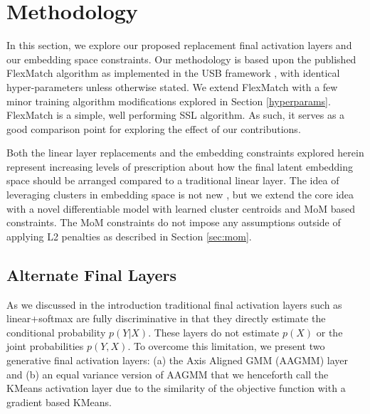 \documentclass[10pt,twocolumn,letterpaper]{article}
\begin{document}




\section{Methodology}

In this section, we explore our proposed replacement final activation layers and our embedding space constraints.
Our methodology is based upon the published FlexMatch \cite{zhang2021flexmatch} algorithm as implemented in the USB framework \cite{wang2022usb}, with identical hyper-parameters unless otherwise stated.
We extend FlexMatch with a few minor training algorithm modifications explored in Section \ref{hyperparams}.
FlexMatch \cite{zhang2021flexmatch} is a simple, well performing SSL algorithm.
As such, it serves as a good comparison point for exploring the effect of our contributions.

Both the linear layer replacements and the embedding constraints explored herein represent increasing levels of prescription about how the final latent embedding space should be arranged compared to a traditional linear layer.
The idea of leveraging clusters in embedding space is not new \cite{caron2018deep,caron2020unsupervised,enguehard2019semi}, but we extend the core idea with a novel differentiable model with learned cluster centroids and MoM based constraints.
The MoM constraints do not impose any assumptions outside of applying L2 penalties as described in Section \ref{sec:mom}.

\subsection{Alternate Final Layers}

As we discussed in the introduction traditional final activation layers such as linear+softmax are fully discriminative in that they directly estimate the conditional probability $p(Y|X)$. 
These layers do not estimate $p(X)$ or the joint probabilities $p(Y,X)$.
To overcome this limitation, we present two generative final activation layers: (a) the Axis Aligned GMM (AAGMM) layer and (b) an equal variance version of AAGMM that we henceforth call the KMeans activation layer due to the similarity of the objective function with a gradient based KMeans.
\end{document}

